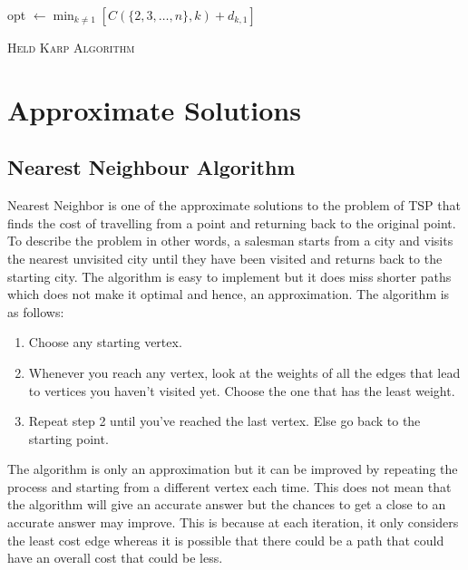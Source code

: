 \documentclass[12pt]{report}
\begin{document}
\begin{algorithm*}
    opt $\leftarrow \min_{k \neq 1} [C(\{2,3,\dots, n\}, k) + d_{k,1}]$ \\  
\caption{\textsc{Held Karp Algorithm}}
\end{algorithm*}


\section{Approximate Solutions}
\subsection {Nearest Neighbour Algorithm}
    Nearest Neighbor is one of the approximate solutions to the problem of TSP that finds the cost of travelling from a point and returning back to the original point. To describe the problem in other words, a salesman starts from a city and visits the nearest unvisited city until they have been visited and returns back to the starting city. The algorithm is easy to implement but it does miss shorter paths which does not make it optimal and hence, an approximation.
    The algorithm is as follows: 
    \begin{enumerate}
        \item Choose any starting vertex.
        \item Whenever you reach any vertex, look at the weights of all the edges that lead to vertices you haven’t visited yet. Choose the one that has the least weight.
        \item Repeat step 2 until you’ve reached the last vertex. Else go back to the starting point. 
    \end{enumerate}
        The algorithm is only an approximation but it can be improved by repeating the process and starting from a different vertex each time. This does not mean that the algorithm will give an accurate answer but the chances to get a close to an accurate answer may improve. This is because at each iteration, it only considers the least cost edge whereas it is possible that there could be a path that could have an overall cost that could be less.   
\end{document}
